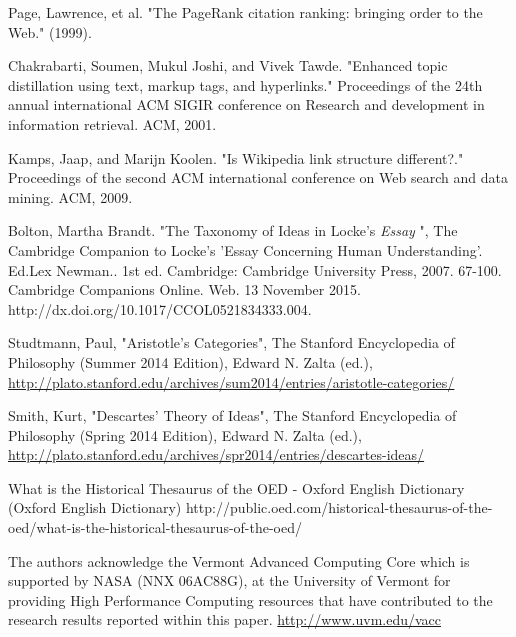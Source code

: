 \documentclass[pre,twocolumn,twoside,superscriptaddress,floatfix, aps, 10pt]{revtex4-1}
\begin{document}
\begin{thebibliography}{1}
       Page, Lawrence, et al. "The PageRank citation ranking: bringing order to the Web." (1999).

       Chakrabarti, Soumen, Mukul Joshi, and Vivek Tawde. "Enhanced topic distillation using text, markup tags, and hyperlinks." Proceedings of the 24th annual international ACM SIGIR conference on Research and development in information retrieval. ACM, 2001.

       Kamps, Jaap, and Marijn Koolen. "Is Wikipedia link structure different?." Proceedings of the second ACM international conference on Web search and data mining. ACM, 2009.

     Bolton, Martha Brandt. "The Taxonomy of Ideas in Locke’s {\it Essay} ", The Cambridge Companion to Locke's 'Essay Concerning Human Understanding'. Ed.Lex Newman.. 1st ed. Cambridge: Cambridge University Press, 2007. 67-100. Cambridge Companions Online. Web. 13 November 2015. http://dx.doi.org/10.1017/CCOL0521834333.004.

     Studtmann, Paul, "Aristotle's Categories", The Stanford Encyclopedia of Philosophy (Summer 2014 Edition), Edward N. Zalta (ed.), \url{http://plato.stanford.edu/archives/sum2014/entries/aristotle-categories/}

     Smith, Kurt, "Descartes' Theory of Ideas", The Stanford Encyclopedia of Philosophy (Spring 2014 Edition), Edward N. Zalta (ed.), \url{http://plato.stanford.edu/archives/spr2014/entries/descartes-ideas/}


     What is the Historical Thesaurus of the OED - Oxford English Dictionary (Oxford English Dictionary)
    http://public.oed.com/historical-thesaurus-of-the-oed/what-is-the-historical-thesaurus-of-the-oed/

     The authors acknowledge the Vermont Advanced Computing Core which is supported by NASA (NNX 06AC88G), at the University of Vermont for providing High Performance Computing resources that have contributed to the research results reported within this paper.
    \url{http://www.uvm.edu/vacc}

\end{thebibliography}
\end{document}
